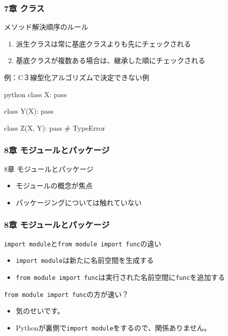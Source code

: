 \documentclass[aspectratio=169,dvipdfmx,12pt,notheorems]{beamer}
\theoremstyle{definition}
\begin{document}
\begin{frame}[fragile]\frametitle{7章 クラス}

\begin{block}{メソッド解決順序のルール}
\begin{enumerate}
\item 派生クラスは常に基底クラスよりも先にチェックされる
\item 基底クラスが複数ある場合は、継承した順にチェックされる
\end{enumerate}
\end{block}

\begin{alertblock}{例：C３線型化アルゴリズムで決定できない例}
\begin{pygments}{python}    
class X:
    pass
    
class Y(X):
    pass
    
class Z(X, Y):
    pass  # TypeError
\end{pygments}
\end{alertblock}

\end{frame}

\begin{frame}\frametitle{8章 モジュールとパッケージ}

\begin{block}{8章 モジュールとパッケージ}
\begin{itemize}
\item モジュールの概念が焦点
\item パッケージングについては触れていない
\end{itemize}
\end{block}

\end{frame}

\begin{frame}\frametitle{8章 モジュールとパッケージ}

\begin{block}{\texttt{import module}と\texttt{from module import func}の違い}
\begin{itemize}
\item \texttt{import module}は新たに名前空間を生成する
\item \texttt{from module import func}は実行された名前空間に\texttt{func}を追加する
\end{itemize}
\end{block}

\begin{alertblock}{\texttt{from module import func}の方が速い？}
\begin{itemize}
\item 気のせいです。
\item Pythonが裏側で\texttt{import module}をするので、関係ありません。
\end{itemize}
\end{alertblock}

\end{frame}
\end{document}
